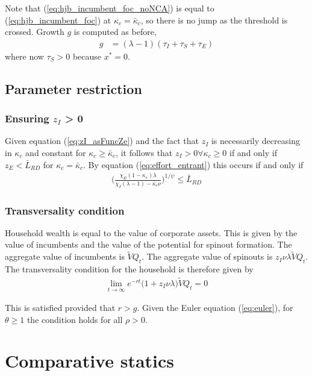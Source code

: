 \documentclass[12pt,english]{article}
\theoremstyle{remark}
\begin{document}
Note that (\ref{eq:hjb_incumbent_foc_noNCA}) is equal to (\ref{eq:hjb_incumbent_foc}) at $\kappa_{c} = \bar{\kappa}_c$, so there is no jump as the threshold is crossed. Growth $g$ is computed as before,
\begin{align}
g &= (\lambda - 1)(\tau_I + \tau_S + \tau_E) \label{eq:growth_accounting_noNCA}
\end{align}
where now $\tau_S > 0$ because $x^* = 0$. 

\subsection{Parameter restriction}

\subsubsection{Ensuring $z_I$ > 0}
Given equation (\ref{eq:zI_asFuncZe}) and the fact that $z_I$ is necessarily decreasing in $\kappa_c$ and constant for $\kappa_c \ge \bar{\kappa}_c$, it follows that $z_I > 0 \forall \kappa_c \ge 0$ if and only if $z_E < \bar{L}_{RD}$ for $\kappa_c = \bar{\kappa}_c$. By equation (\ref{eq:effort_entrant}) this occurs if and only if
\begin{align}
	\Big( \frac{\chi_E (1-\kappa_{e}) \lambda}{\chi_I(\lambda-1) - \bar{\kappa}_c \nu } \Big)^{1/\psi} \le \bar{L}_{RD}
\end{align}

\subsubsection{Transversality condition}

Household wealth is equal to the value of corporate assets. This is given by the value of incumbents and the value of the potential for spinout formation. The aggregate value of incumbents is $\tilde{V}Q_t$. The aggregate value of spinouts is $z_I \nu \lambda \tilde{V} Q_t$. The transversality condition for the household is therefore given by 
\begin{align}
	\lim_{t \to \infty} e^{-rt} \big(1 + z_I \nu \lambda \big)\tilde{V} Q_t = 0
\end{align}

This is satisfied provided that $r > g$. Given the Euler equation (\ref{eq:euler}), for $\theta \ge 1$ the condition holds for all $\rho > 0$. 

\section{Comparative statics}
\end{document}
